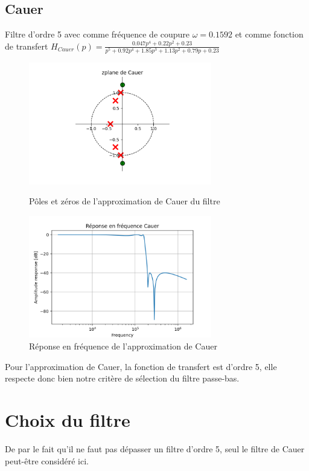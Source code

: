 \documentclass[a4paper,12pt,oneside]{report}	%
\begin{document}
        \subsection{Cauer}
            Filtre d'ordre 5 avec comme fréquence de coupure $\omega = 0.1592$ et comme fonction de transfert $H_{Cauer}(p) = \frac{0.047p^4 + 0.22p^2 + 0.23}{p^5 + 0.92p^4 + 1.85p^3 + 1.13p^2 + 0.79p + 0.23}$
            \begin{figure}[h!]
                \centering
                \includegraphics[width = 8cm]{images/2.0.0 - zplane de Cauer.png}
                \caption{Pôles et zéros de l'approximation de Cauer du filtre}
                \label{fig:zplane-Cauer}
                \includegraphics[width = 8cm]{images/2.0.0 - Réponse en fréquence Cauer.png}
                \caption{Réponse en fréquence de l'approximation de Cauer}
                \label{fig:repfreq-Cauer}
            \end{figure}
            
            Pour l’approximation de Cauer, la fonction de transfert est d'ordre 5, elle respecte donc bien notre critère de sélection du filtre passe-bas.
\newpage
    \section{Choix du filtre}
        De par le fait qu'il ne faut pas dépasser un filtre d'ordre 5, seul le filtre de Cauer peut-être considéré ici. 
\end{document}
